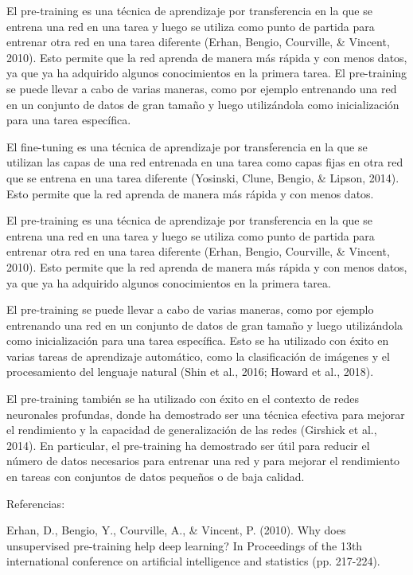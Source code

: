 El pre-training es una técnica de aprendizaje por transferencia en la que se entrena una red en una tarea y luego se
utiliza como punto de partida para entrenar otra red en una tarea diferente (Erhan, Bengio, Courville, \& Vincent,
2010). Esto permite que la red aprenda de manera más rápida y con menos datos, ya que ya ha adquirido algunos
conocimientos en la primera tarea. El pre-training se puede llevar a cabo de varias maneras, como por ejemplo
entrenando una red en un conjunto de datos de gran tamaño y luego utilizándola como inicialización para una tarea
específica.

El fine-tuning es una técnica de aprendizaje por transferencia en la que se utilizan las capas de una red entrenada en
una tarea como capas fijas en otra red que se entrena en una tarea diferente (Yosinski, Clune, Bengio, \& Lipson,
2014). Esto permite que la red aprenda de manera más rápida y con menos datos.

El pre-training es una técnica de aprendizaje por transferencia en la que se entrena una red en una tarea y luego se
utiliza como punto de partida para entrenar otra red en una tarea diferente (Erhan, Bengio, Courville, \& Vincent,
2010). Esto permite que la red aprenda de manera más rápida y con menos datos, ya que ya ha adquirido algunos
conocimientos en la primera tarea.

El pre-training se puede llevar a cabo de varias maneras, como por ejemplo entrenando una red en un conjunto de datos
de gran tamaño y luego utilizándola como inicialización para una tarea específica. Esto se ha utilizado con éxito en
varias tareas de aprendizaje automático, como la clasificación de imágenes y el procesamiento del lenguaje natural
(Shin et al., 2016; Howard et al., 2018).

El pre-training también se ha utilizado con éxito en el contexto de redes neuronales profundas, donde ha demostrado ser
una técnica efectiva para mejorar el rendimiento y la capacidad de generalización de las redes (Girshick et al., 2014).
En particular, el pre-training ha demostrado ser útil para reducir el número de datos necesarios para entrenar una red
y para mejorar el rendimiento en tareas con conjuntos de datos pequeños o de baja calidad.

Referencias:

Erhan, D., Bengio, Y., Courville, A., \& Vincent, P. (2010). Why does unsupervised pre-training help deep learning? In
Proceedings of the 13th international conference on artificial intelligence and statistics (pp. 217-224).

